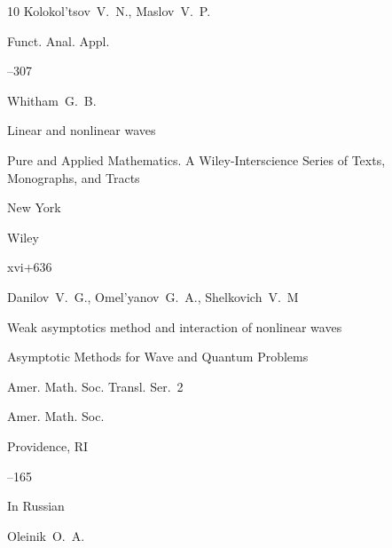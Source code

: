 \begin{thebibliography}{10}
\by  Kolokol'tsov~V.~N.,  Maslov~V.~P.



\jour Funct. Anal. Appl.




--307






\by Whitham~G.~B.

\book Linear and nonlinear waves


\serial Pure and Applied Mathematics. A Wiley-Interscience Series of Texts, Monographs, and Tracts

\publaddr New York

\publ Wiley

\totalpages xvi+636 







\by Danilov~V.~G., Omel'yanov~G.~A., Shelkovich~V.~M

\paper  Weak asymptotics method and interaction of nonlinear waves 

\inbook Asymptotic Methods for Wave and Quantum Problems


\serial Amer. Math. Soc. Transl. Ser.~2


\publ Amer. Math. Soc.

\publaddr Providence, RI

--165







\lang In Russian

\by Oleinik~O.~A.


\end{thebibliography}
